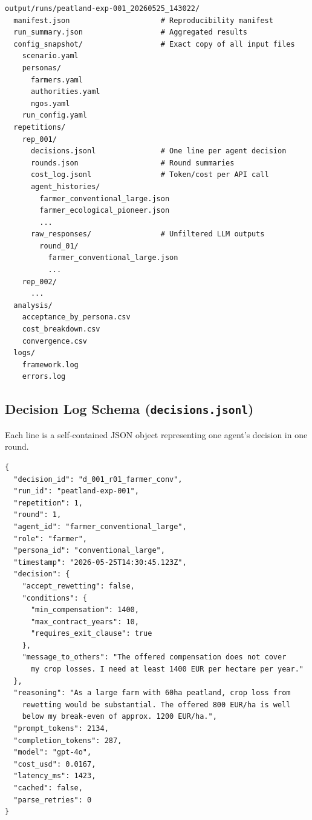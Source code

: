 \documentclass[12pt, a4paper]{article}
\begin{document}
\begin{lstlisting}[style=directory, caption={Output directory layout for a single run.}]
output/runs/peatland-exp-001_20260525_143022/
  manifest.json                     # Reproducibility manifest
  run_summary.json                  # Aggregated results
  config_snapshot/                  # Exact copy of all input files
    scenario.yaml
    personas/
      farmers.yaml
      authorities.yaml
      ngos.yaml
    run_config.yaml
  repetitions/
    rep_001/
      decisions.jsonl               # One line per agent decision
      rounds.json                   # Round summaries
      cost_log.jsonl                # Token/cost per API call
      agent_histories/
        farmer_conventional_large.json
        farmer_ecological_pioneer.json
        ...
      raw_responses/                # Unfiltered LLM outputs
        round_01/
          farmer_conventional_large.json
          ...
    rep_002/
      ...
  analysis/
    acceptance_by_persona.csv
    cost_breakdown.csv
    convergence.csv
  logs/
    framework.log
    errors.log
\end{lstlisting}

\subsection{Decision Log Schema (\texttt{decisions.jsonl})}

Each line is a self-contained JSON object representing one agent's decision in one round.

\begin{lstlisting}[style=json, caption={Decision log entry (one line in JSONL).}, label={lst:decision}]
{
  "decision_id": "d_001_r01_farmer_conv",
  "run_id": "peatland-exp-001",
  "repetition": 1,
  "round": 1,
  "agent_id": "farmer_conventional_large",
  "role": "farmer",
  "persona_id": "conventional_large",
  "timestamp": "2026-05-25T14:30:45.123Z",
  "decision": {
    "accept_rewetting": false,
    "conditions": {
      "min_compensation": 1400,
      "max_contract_years": 10,
      "requires_exit_clause": true
    },
    "message_to_others": "The offered compensation does not cover
      my crop losses. I need at least 1400 EUR per hectare per year."
  },
  "reasoning": "As a large farm with 60ha peatland, crop loss from
    rewetting would be substantial. The offered 800 EUR/ha is well
    below my break-even of approx. 1200 EUR/ha.",
  "prompt_tokens": 2134,
  "completion_tokens": 287,
  "model": "gpt-4o",
  "cost_usd": 0.0167,
  "latency_ms": 1423,
  "cached": false,
  "parse_retries": 0
}
\end{lstlisting}
\end{document}

